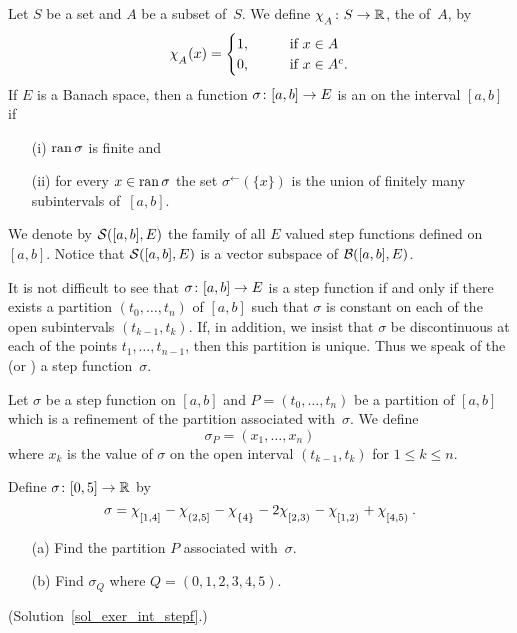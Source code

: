 \begin{defn} Let $S$ be a set and $A$ be a subset of~$S$.  We define
$\chi_{{}_{{\scriptstyle{A}}}}\colon S \rightarrow \mathbb{R}$, the
 of~$A$, by
  \[ \chi_{{}_{{\scriptstyle{A}}}}(x) =
      \begin{cases}
                 1,  \qquad &\text{if $x \in A$} \\
                 0,  \qquad &\text{if $x \in A^c$}.
      \end{cases} \]
If $E$ is a Banach space, then a function $\sigma\colon [a,b] \rightarrow E$ is an
 on the interval $[a,b]$ if
 \begin{enumerate}
  \item[(i)] $\operatorname{ran} \sigma$ is finite and
  \item[(ii)] for every $x \in \operatorname{ran}\sigma$ the set $\sigma^\gets(\{x\})$ is the union of finitely
many subintervals of~$[a,b]$.
 \end{enumerate}
We denote by $\mathcal{S}([a,b],E)$ the family of all $E$ valued step functions defined on~$[a,b]$.
Notice that $\mathcal{S}([a,b],E)$ is a vector subspace of $\mathcal{B}([a,b],E)$.
\end{defn}

It is not difficult to see that $\sigma\colon [a,b] \rightarrow E$ is a step function if and only if
there exists a partition $(t_0, \dots, t_n)$ of $[a,b]$ such that $\sigma$ is constant on each
of the open subintervals $(t_{k-1},t_k)$.  If, in addition, we insist that $\sigma$ be
discontinuous at each of the points $t_1, \dots, t_{n-1}$, then this partition is unique.
Thus we speak of the
 (or ) a step
function~$\sigma$.

\begin{notn} Let $\sigma$ be a step function on $[a,b]$ and $P = (t_0, \dots, t_n)$ be a partition
of $[a,b]$ which is a refinement of the partition associated with~$\sigma$.  We define
 \[ \sigma_P = (x_1, \dots, x_n) \]
where $x_k$ is the value of $\sigma$ on the open interval $(t_{k-1},t_k)$ for $1 \le k \le n$.
\end{notn}


\begin{exer}\label{exer_int_stepf}  Define $\sigma\colon [0,5] \rightarrow \mathbb{R}$ by
  \[ \sigma = \chi_{{}_{\scriptstyle{[1,4]}}}
            - \chi_{{}_{\scriptstyle{(2,5]}}}
            - \chi_{{}_{\scriptstyle{\{4\}}}}
           -2 \chi_{{}_{\scriptstyle{[2,3)}}}
            - \chi_{{}_{\scriptstyle{[1,2)}}}
            + \chi_{{}_{\scriptstyle{[4,5)}}}\,. \]
 \begin{enumerate}
  \item[(a)] Find the partition $P$ associated with~$\sigma$.
  \item[(b)] Find $\sigma_Q$ where $Q = (0,1,2,3,4,5)$.
 \end{enumerate}
(Solution~\ref{sol_exer_int_stepf}.)
\end{exer}


